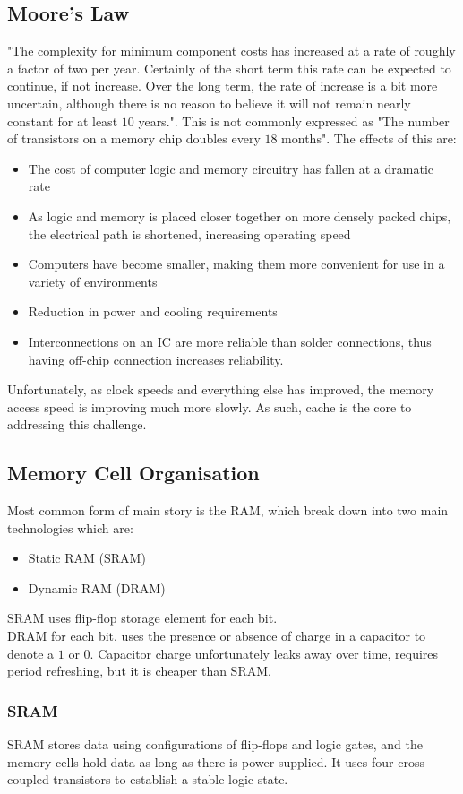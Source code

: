\documentclass[a4paper]{article}
\theoremstyle{plain}
\theoremstyle{definition}
\theoremstyle{remark}
\begin{document}
 \subsection{Moore's Law}
"The complexity for minimum component costs has increased at a rate of roughly a factor of two per year. Certainly of the short term this rate can be expected to continue, if not increase. Over the long term, the rate of increase is a bit more uncertain, although there is no reason to believe it will not remain nearly constant for at least $10$ years.". This is not commonly expressed as "The number of transistors on a memory chip doubles every $18$ months".
The effects of this are: 
\begin{itemize}
	\item The cost of computer logic and memory circuitry has fallen at a dramatic rate
	\item As logic and memory is placed closer together on more densely packed chips, the electrical path is shortened, increasing operating speed
	\item Computers have become smaller, making them more convenient for use in a variety of environments
	\item Reduction in power and cooling requirements
	\item Interconnections on an IC are more reliable than solder connections, thus having off-chip connection increases reliability.
\end{itemize}
Unfortunately, as clock speeds and everything else has improved, the memory access speed is improving much more slowly. As such, cache is the core to addressing this challenge.
\subsection{Memory Cell Organisation}
Most common form of main story is the RAM, which break down into two main technologies which are:
\begin{itemize}
	\item Static RAM (SRAM)
	\item Dynamic RAM (DRAM)
\end{itemize}
SRAM uses flip-flop storage element for each bit. \\
DRAM for each bit, uses the presence or absence of charge in a capacitor to denote a $1$ or $0$.
Capacitor charge unfortunately leaks away over time, requires period refreshing, but it is cheaper than SRAM.
\subsubsection{SRAM}
SRAM stores data using configurations of flip-flops and logic gates, and the memory cells hold data as long as there is power supplied. It uses four cross-coupled transistors to establish a stable logic state.
\end{document}
